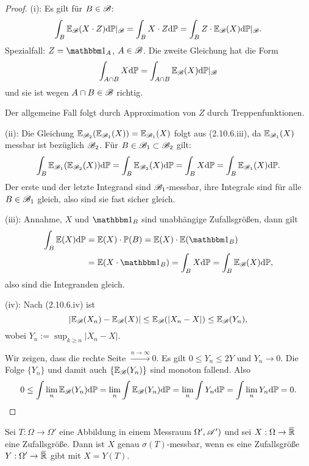 \begin{proof}
  (i): Es gilt für $B \in \mathscr{B}$:
  \[ \int_B \mathbb{E}_{\mathscr{B}}(X \cdot Z) \mathrm{d} \mathbb{P}|_{\mathscr{B}} = \int_B X \cdot Z \mathrm{d} \mathbb{P}
    = \int_B Z \cdot \mathbb{E}_{\mathscr{B}}(X) \mathrm{d} \mathbb{P}|_{\mathscr{B}}. \]
  Spezialfall: $Z = \ind_A$, $A \in \mathscr{B}$. Die zweite Gleichung hat die Form
  \[ \int_{A \cap B} X \mathrm{d} \mathbb{P} = \int_{A \cap B} \mathbb{E}_{\mathscr{B}}(X) \mathrm{d}
    \mathbb{P}|_{\mathscr{B}} \]
  und sie ist wegen $A \cap B \in \mathscr{B}$ richtig.

  Der allgemeine Fall folgt durch Approximation von $Z$ durch Treppenfunktionen.

  (ii): Die Gleichung $\mathbb{E}_{\mathscr{B}_2}( \mathbb{E}_{\mathscr{B}_1}(X) ) = \mathbb{E}_{\mathscr{B}_1}(X)$ folgt aus
  (2.10.6.iii), da $\mathbb{E}_{\mathscr{B}_1}(X)$ messbar ist bezüglich $\mathscr{B}_2$. Für $B \in
  \mathscr{B}_1 \subset \mathscr{B}_2$ gilt:
  \[ \int_B \mathbb{E}_{\mathscr{B}_1}(\mathbb{E}_{\mathscr{B}_2}(X)) \mathrm{d} \mathbb{P} =
    \int_B \mathbb{E}_{\mathscr{B}_2}(X) \mathrm{d} \mathbb{P} = \int_B X \mathrm{d} \mathbb{P} = \int_B
    \mathbb{E}_{\mathscr{B}_1}(X) \mathrm{d} \mathbb{P}. \]
  Der erste und der letzte Integrand sind $\mathscr{B}_1$-messbar, ihre Integrale sind
  für alle $B \in \mathscr{B}_1$ gleich, also sind sie fast sicher gleich.

  (iii): Annahme, $X$ und $\ind_B$ sind unabhängige Zufallsgrößen, dann gilt
  \begin{align*}
    \int_B \pE(X) \diffop \pP
    &= \pE(X) \cdot \pP(B) = \pE(X) \cdot \pE(\ind_B) \\
    &= \pE(X \cdot \ind_B) = \int_B X \diffop \pP = \int_B \pE_\mB(X) \diffop \pP,
  \end{align*}
  also sind die Integranden gleich.

  (iv): Nach (2.10.6.iv) ist
  \[ |\mathbb{E}_{\mathscr{B}}(X_n) - \mathbb{E}_{\mathscr{B}}(X)| \le \mathbb{E}_{\mathscr{B}}(|X_n - X|) \le \mathbb{E}_{\mathscr{B}}(Y_n), \]
  wobei $Y_n := \sup_{k \ge n} |X_n - X|$.

  Wir zeigen, dass die rechte Seite
  $\xrightarrow{n \to \infty} 0$. Es gilt $0 \le Y_n \le 2Y$ und $Y_n\to 0$. Die
  Folge $\{ Y_n \}$ und damit auch $\{\mathbb{E}_{\mathscr{B}}(Y_n)\}$ sind monoton fallend. Also
  \[ 0 \le \int \lim_n \mathbb{E}_{\mathscr{B}}(Y_n) \mathrm{d} \mathbb{P} = \lim_n \int \mathbb{E}_{\mathscr{B}}(Y_n)
    \mathrm{d} \mathbb{P} = \lim_n \int Y_n \mathrm{d} \mathbb{P} = \int \lim_n Y_n \mathrm{d} \mathbb{P} =
    0. \qedhere \]
\end{proof}

\begin{thm}[Faktorisierungslemma]
  Sei $T: \Omega \to \Omega'$ eine Abbildung in einem Messraum $\Omega', \mathscr{A}')$
  und sei $X : \Omega \to \realext$ eine Zufallsgröße. Dann ist $X$ genau
  $\sigma(T)$-messbar, wenn es eine Zufallsgröße $Y : \Omega' \to \realext$ gibt
  mit $X = Y(T)$.
\end{thm}

